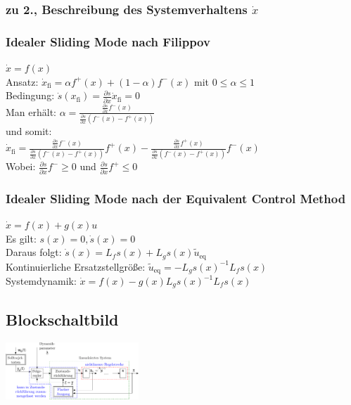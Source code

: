 \documentclass[german]{latex4ei/latex4ei_sheet}
\begin{document}
\begin{sectionbox}
\subsubsection[zu 2.]{zu 2., Beschreibung des Systemverhaltens $\dot{x}$}

\subsubsection{Idealer Sliding Mode nach Filippov}
$\dot{x} = f(x)$\\
Ansatz: $\dot{x}_\text{fi} = \alpha f^+(x) + (1-\alpha) f^-(x)$ mit $0 \leq \alpha \leq 1$ \\
Bedingung: $\dot{s}(x_\text{fi}) = \frac{\partial s}{\partial x} \dot{x}_\text{fi} = 0$ \\
Man erhält: $\alpha = \frac{ \frac{\partial s}{\partial x} f^-(x)  }{ \frac{\partial s}{\partial x} (f^-(x) - f^+(x))  }$ \\
und somit:\\ $\dot{x}_\text{fi} = \frac{ \frac{\partial s}{\partial x} f^-(x)  }{ \frac{\partial s}{\partial x} (f^-(x) - f^+(x)) } f^+(x) -
\frac{ \frac{\partial s}{\partial x} f^+(x)  }{ \frac{\partial s}{\partial x} (f^-(x) - f^+(x)) } f^-(x)$ \\
Wobei: $\frac{\partial s}{\partial x}f^- \geq 0$ und $\frac{\partial s}{\partial x}f^+ \leq 0$ \\

\subsubsection{Idealer Sliding Mode nach der Equivalent Control Method}
$\dot{x} = f(x) + g(x)u$ \\
Es gilt: $s(x) = 0, \dot{s}(x) = 0$ \\
Daraus folgt: $\dot{s}(x) = L_f s(x) + L_g s(x) \tilde{u}_\text{eq}$ \\
Kontinuierliche Ersatzstellgröße: $\tilde{u}_\text{eq} = -L_g s(x) ^{-1} L_f s(x)$ \\
Systemdynamik: $\dot{x} = f(x) - g(x) L_g s(x)^{-1} L_f s(x)$
\end{sectionbox}

\begin{sectionbox}
\subsection{Blockschaltbild}
\includegraphics[angle=90, width=5cm]{./img/block.pdf}
\end{sectionbox}
\end{document}
